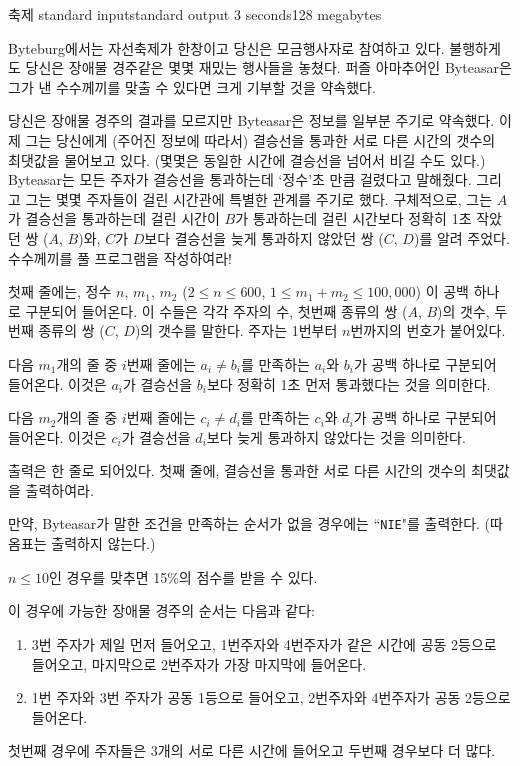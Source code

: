 \begin{problem}{축제}
	{standard input}{standard output}
	{3 seconds}{128 megabytes}{}
	
	
	Byteburg에서는 자선축제가 한창이고 당신은 모금행사자로 참여하고 있다. 불행하게도 당신은 장애물 경주같은 몇몇 재밌는 행사들을 놓쳤다. 퍼즐 아마추어인 Byteasar은 그가 낸 수수께끼를 맞출 수 있다면 크게 기부할 것을 약속했다.
	
	당신은 장애물 경주의 결과를 모르지만 Byteasar은 정보를 일부분 주기로 약속했다. 이제 그는 당신에게 (주어진 정보에 따라서) 결승선을 통과한 서로 다른 시간의 갯수의 최댓값을 물어보고 있다. (몇몇은 동일한 시간에 결승선을 넘어서 비길 수도 있다.) Byteasar는 모든 주자가 결승선을 통과하는데 `정수'초 만큼 걸렸다고 말해줬다. 그리고 그는 몇몇 주자들이 걸린 시간관에 특별한 관계를 주기로 했다. 구체적으로, 그는 $A$가 결승선을 통과하는데 걸린 시간이 $B$가 통과하는데 걸린 시간보다 정확히 1초 작았던 쌍 ($A$, $B$)와, $C$가 $D$보다 결승선을 늦게 통과하지 않았던 쌍 ($C$, $D$)를 알려 주었다. 수수께끼를 풀 프로그램을 작성하여라!
	

	\InputFile
	
	첫째 줄에는, 정수 $n$, $m_1$, $m_2$ ($2 \le n \le 600$, $1 \le m_1 + m_2 \le 100,000$) 이 공백 하나로 구분되어 들어온다. 이 수들은 각각 주자의 수, 첫번째 종류의 쌍 ($A$, $B$)의 갯수, 두번째 종류의 쌍 ($C$, $D$)의 갯수를 말한다. 주자는 1번부터 $n$번까지의 번호가 붙어있다.
	
	다음 $m_1$개의 줄 중 $i$번째 줄에는 $a_i \neq b_i$를 만족하는 $a_i$와 $b_i$가 공백 하나로 구분되어 들어온다. 이것은 $a_i$가 결승선을 $b_i$보다 정확히 1초 먼저 통과했다는 것을 의미한다.
	
	다음 $m_2$개의 줄 중 $i$번째 줄에는 $c_i \neq d_i$를 만족하는 $c_i$와 $d_i$가 공백 하나로 구분되어 들어온다. 이것은 $c_i$가 결승선을 $d_i$보다 늦게 통과하지 않았다는 것을 의미한다.
	
	\OutputFile
	
	출력은 한 줄로 되어있다. 첫째 줄에, 결승선을 통과한 서로 다른 시간의 갯수의 최댓값을 출력하여라.
	
	만약, Byteasar가 말한 조건을 만족하는 순서가 없을 경우에는 ``\texttt{NIE}"를 출력한다. (따옴표는 출력하지 않는다.)
	
	$n \le 10$인 경우를 맞추면 15\%의 점수를 받을 수 있다.
	
	\Examples
		
	\begin{example}
	\end{example}
	
	이 경우에 가능한 장애물 경주의 순서는 다음과 같다:
	\begin{enumerate}
		\item 3번 주자가 제일 먼저 들어오고, 1번주자와 4번주자가 같은 시간에 공동 2등으로 들어오고, 마지막으로 2번주자가 가장 마지막에 들어온다.
		
		\item 1번 주자와 3번 주자가 공동 1등으로 들어오고, 2번주자와 4번주자가 공동 2등으로 들어온다.
	\end{enumerate}
	
	첫번째 경우에 주자들은 3개의 서로 다른 시간에 들어오고 두번째 경우보다 더 많다.
        
\end{problem}

